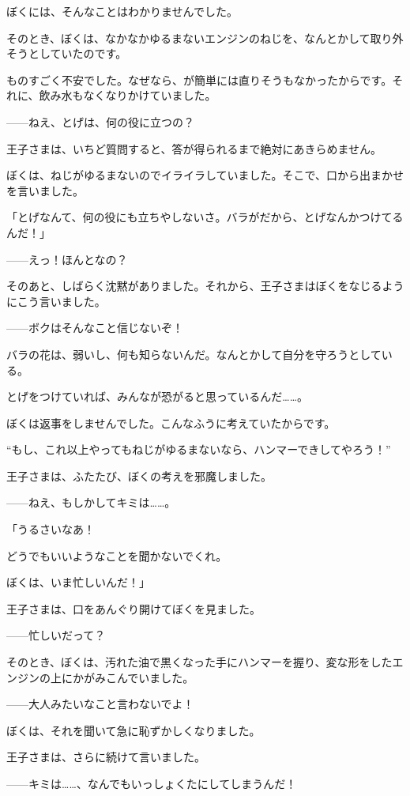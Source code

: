 
ぼくには、そんなことはわかりませんでした。

そのとき、ぼくは、なかなかゆるまないエンジンのねじを、なんとかして取り外そうとしていたのです。

ものすごく不安でした。なぜなら、が簡単には直りそうもなかったからです。それに、飲み水もなくなりかけていました。

——ねえ、とげは、何の役に立つの？

王子さまは、いちど質問すると、答が得られるまで絶対にあきらめません。

ぼくは、ねじがゆるまないのでイライラしていました。そこで、口から出まかせを言いました。

「とげなんて、何の役にも立ちやしないさ。バラがだから、とげなんかつけてるんだ！」

——えっ！ほんとなの？

そのあと、しばらく沈黙がありました。それから、王子さまはぼくをなじるようにこう言いました。

——ボクはそんなこと信じないぞ！

バラの花は、弱いし、何も知らないんだ。なんとかして自分を守ろうとしている。

とげをつけていれば、みんなが恐がると思っているんだ……。

ぼくは返事をしませんでした。こんなふうに考えていたからです。

“もし、これ以上やってもねじがゆるまないなら、ハンマーできしてやろう！”

王子さまは、ふたたび、ぼくの考えを邪魔しました。

——ねえ、もしかしてキミは……。

「うるさいなあ！

どうでもいいようなことを聞かないでくれ。

ぼくは、いま忙しいんだ！」

王子さまは、口をあんぐり開けてぼくを見ました。

——忙しいだって？

そのとき、ぼくは、汚れた油で黒くなった手にハンマーを握り、変な形をしたエンジンの上にかがみこんでいました。

——大人みたいなこと言わないでよ！

ぼくは、それを聞いて急に恥ずかしくなりました。

王子さまは、さらに続けて言いました。

——キミは……、なんでもいっしょくたにしてしまうんだ！

